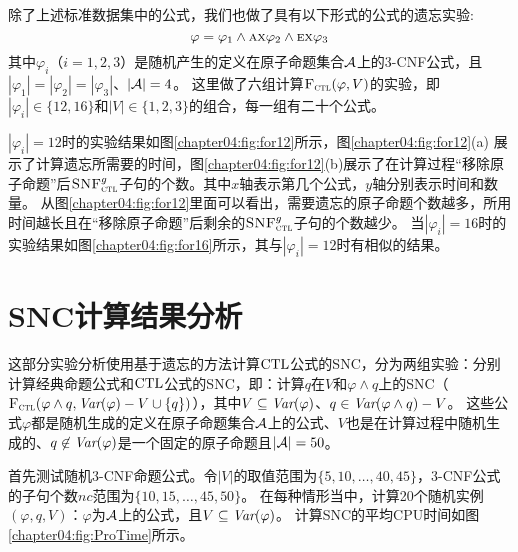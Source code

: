 除了上述标准数据集中的公式，我们也做了具有以下形式的公式的遗忘实验:
$$\varphi=\varphi_1 \wedge \textsc{a}\textsc{x} \varphi_2 \wedge \textsc{e}\textsc{x} \varphi_3$$
其中$\varphi_i$（$i=1,2,3$）是随机产生的定义在原子命题集合${\cal A}$上的3-CNF公式，且$|\varphi_1| = |\varphi_2| =|\varphi_3|$、$|{\cal A}|=4$。
这里做了六组计算${\textsc{F}_{\textsc{ctl}}}(\varphi,V)$的实验，即$|\varphi_i| \in \{12,16\}$和$|V|\in \{1,2,3\}$的组合，每一组有二十个公式。

$|\varphi_i|=12$时的实验结果如图\ref{chapter04:fig:for12}所示，图\ref{chapter04:fig:for12}(a) 展示了计算遗忘所需要的时间，图\ref{chapter04:fig:for12}(b)展示了在计算过程“移除原子命题”后${\textsc{SNF}_{\textsc{ctl}}^g}$子句的个数。其中$x$轴表示第几个公式，$y$轴分别表示时间和数量。
从图\ref{chapter04:fig:for12}里面可以看出，需要遗忘的原子命题个数越多，所用时间越长且在“移除原子命题”后剩余的${\textsc{SNF}_{\textsc{ctl}}^g}$子句的个数越少。
当$|\varphi_i|=16$时的实验结果如图\ref{chapter04:fig:for16}所示，其与$|\varphi_i|=12$时有相似的结果。

\begin{figure*}[!htb]
	\centering
	\caption{$\varphi_i=12$时的计算结果}
	\label{chapter04:fig:for12}
\end{figure*}

\begin{figure*}[!htb]
	\centering
	\caption{$\varphi_i=16$时的计算结果}
	\label{chapter04:fig:for16}
\end{figure*}

\section{SNC计算结果分析}
这部分实验分析使用基于遗忘的方法计算$\textrm{CTL}$公式的SNC，分为两组实验：分别计算经典命题公式和$\textrm{CTL}$公式的SNC，即：计算$q$在$V$和$\varphi \wedge q$上的SNC（${\textsc{F}_{\textsc{ctl}}}(\varphi\wedge q, \textit{Var}(\varphi)-V \cup \{q\})$），其中$V\subseteq \textit{Var}(\varphi)$、$q\in \textit{Var}(\varphi\wedge q)-V$。
这些公式$\varphi$都是随机生成的定义在原子命题集合${\cal A}$上的公式、$V$也是在计算过程中随机生成的、$q\not \in \textit{Var}(\varphi)$是一个固定的原子命题且$|{\cal A}|=50$。

首先测试随机3-CNF命题公式。令$|V|$的取值范围为$\{5,10,\dots, 40,45\}$，3-CNF公式的子句个数$nc$范围为$\{10,15,\dots, 45,50\}$。
在每种情形当中，计算20个随机实例$(\varphi,q,V)$：$\varphi$为${\cal A}$上的公式，且$V\subseteq \textit{Var}(\varphi)$。
计算SNC的平均CPU时间如图\ref{chapter04:fig:ProTime}所示。

